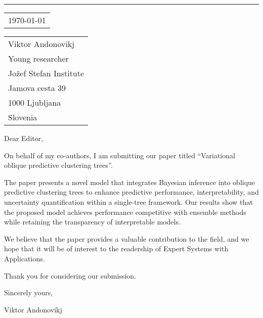\documentclass{article}
\begin{document}
\vspace*{\dimexpr-\headsep-\headheight-1pt}


\rule{\linewidth}{1pt}

\bigskip\bigskip

\hfill
\begin{tabular}{ l @{} }
  \today \\[12pt] %
\end{tabular}

\bigskip

\begin{tabular}{ @{} l }
  Viktor Andonovikj \\ %
  Young researcher \\ %
  Jožef Stefan Institute \\
  Jamova cesta 39 \\
  1000 Ljubljana\\
  Slovenia
\end{tabular}

\bigskip

Dear Editor,

\bigskip

On behalf of my co-authors, I am submitting our paper titled ``Variational oblique predictive clustering trees''.


The paper presents a novel model that integrates Bayesian inference into oblique predictive clustering trees to enhance predictive performance, interpretability, and uncertainty quantification within a single-tree framework. Our results show that the proposed model achieves performance competitive with ensemble methods while retaining the transparency of interpretable models.

We believe that the paper provides a valuable contribution to the field, and we hope that it will be of interest to the readership of Expert Systems with Applications.

Thank you for considering our submission.

\bigskip

Sincerely yours,

\vspace{50pt}

Viktor Andonovikj
\end{document}
